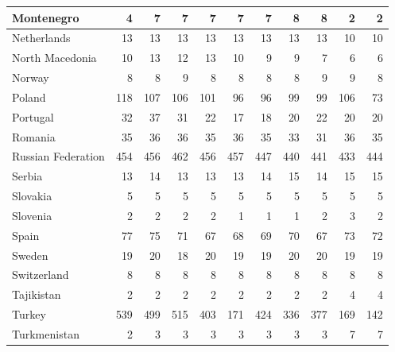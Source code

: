 \begin{table}
\begin{tabular}{|l|r|r|r|r|r|r|r|r|r|r|}
                    Montenegro&      4&      7&      7&      7&      7&      7&      8&      8&      2&      2\\\hline
                   Netherlands&     13&     13&     13&     13&     13&     13&     13&     13&     10&     10\\\hline
               North Macedonia&     10&     13&     12&     13&     10&      9&      9&      7&      6&      6\\\hline
                        Norway&      8&      8&      9&      8&      8&      8&      8&      9&      9&      8\\\hline
                        Poland&    118&    107&    106&    101&     96&     96&     99&     99&    106&     73\\\hline
                      Portugal&     32&     37&     31&     22&     17&     18&     20&     22&     20&     20\\\hline
                       Romania&     35&     36&     36&     35&     36&     35&     33&     31&     36&     35\\\hline
            Russian Federation&    454&    456&    462&    456&    457&    447&    440&    441&    433&    444\\\hline
                        Serbia&     13&     14&     13&     13&     13&     14&     15&     14&     15&     15\\\hline
                      Slovakia&      5&      5&      5&      5&      5&      5&      5&      5&      5&      5\\\hline
                      Slovenia&      2&      2&      2&      2&      1&      1&      1&      2&      3&      2\\\hline
                         Spain&     77&     75&     71&     67&     68&     69&     70&     67&     73&     72\\\hline
                        Sweden&     19&     20&     18&     20&     19&     19&     20&     20&     19&     19\\\hline
                   Switzerland&      8&      8&      8&      8&      8&      8&      8&      8&      8&      8\\\hline
                    Tajikistan&      2&      2&      2&      2&      2&      2&      2&      2&      4&      4\\\hline
                        Turkey&    539&    499&    515&    403&    171&    424&    336&    377&    169&    142\\\hline
                  Turkmenistan&      2&      3&      3&      3&      3&      3&      3&      3&      7&      7\\\hline

\end{tabular}
\end{table}
